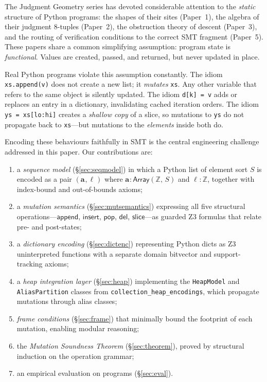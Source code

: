 \documentclass[11pt]{article}
\newcommand{\arrvar}[1]{\mathbf{a}_{#1}}
\newcommand{\lenvar}[1]{\ell_{#1}}
\newcommand{\SeqSort}[1]{\mathsf{Array}(\mathbb{Z},\,#1)}
\newcommand{\MutApp}{\ensuremath{\mathsf{append}}}
\newcommand{\MutIns}{\ensuremath{\mathsf{insert}}}
\newcommand{\MutPop}{\ensuremath{\mathsf{pop}}}
\newcommand{\MutDel}{\ensuremath{\mathsf{del}}}
\newcommand{\MutSlice}{\ensuremath{\mathsf{slice}}}
\begin{document}
\medskip\noindent
The Judgment Geometry series has devoted considerable attention to the
\emph{static} structure of Python programs: the shapes of their sites
(Paper~1), the algebra of their judgment 8-tuples (Paper~2), the
obstruction theory of descent (Paper~3), and the routing of verification
conditions to the correct SMT fragment (Paper~5).  These papers share a
common simplifying assumption: program state is \emph{functional}.  Values
are created, passed, and returned, but never updated in place.

Real Python programs violate this assumption constantly.  The idiom
\lstinline[style=jugeo-python]{xs.append(v)} does not create a new list; it
\emph{mutates} \lstinline[style=jugeo-python]{xs}.  Any other variable that
refers to the same object is silently updated.  The idiom
\lstinline[style=jugeo-python]{d[k] = v} adds or replaces an entry in a
dictionary, invalidating cached iteration orders.  The idiom
\lstinline[style=jugeo-python]{ys = xs[lo:hi]} creates a \emph{shallow copy}
of a slice, so mutations to \lstinline[style=jugeo-python]{ys} do not
propagate back to \lstinline[style=jugeo-python]{xs}---but mutations to the
\emph{elements} inside both do.

Encoding these behaviours faithfully in SMT is the central engineering
challenge addressed in this paper.  Our contributions are:
\begin{enumerate}[label=(\roman*),nosep]
  \item a \emph{sequence model} (\S\ref{sec:seqmodel}) in which a Python list
        of element sort $S$ is encoded as a pair $(\arrvar{},\lenvar{})$
        where $\arrvar{} : \SeqSort{S}$ and $\lenvar{} : \mathbb{Z}$, together
        with index-bound and out-of-bounds axioms;
  \item a \emph{mutation semantics} (\S\ref{sec:mutsemantics}) expressing
        all five structural operations---\MutApp, \MutIns, \MutPop, \MutDel,
        \MutSlice---as guarded Z3 formulas that relate pre- and post-states;
  \item a \emph{dictionary encoding} (\S\ref{sec:dictenc}) representing
        Python dicts as Z3 uninterpreted functions with a separate domain
        bitvector and support-tracking axioms;
  \item a \emph{heap integration layer} (\S\ref{sec:heap}) implementing the
        \texttt{HeapModel} and \texttt{AliasPartition} classes from
        \texttt{collection\_heap\_encodings}, which propagate mutations
        through alias classes;
  \item \emph{frame conditions} (\S\ref{sec:frame}) that minimally bound the
        footprint of each mutation, enabling modular reasoning;
  \item the \emph{Mutation Soundness Theorem} (\S\ref{sec:theorem}), proved
        by structural induction on the operation grammar;
  \item an empirical evaluation on \numcases{} programs (\S\ref{sec:eval}).
\end{enumerate}
\end{document}
